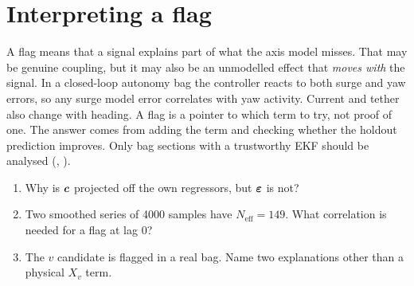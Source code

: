 \section{Interpreting a flag}

A flag means that a signal explains part of what the axis model misses. That may be genuine
coupling, but it may also be an unmodelled effect that \emph{moves with} the signal. In a
closed-loop autonomy bag the controller reacts to both surge and yaw errors, so any surge
model error correlates with yaw activity. Current and tether also change with heading. A
flag is a pointer to which term to try, not proof of one. The answer comes from adding the
term and checking whether the holdout prediction improves. Only bag sections with a
trustworthy EKF should be analysed (, ).

\begin{questions}
\begin{enumerate}
  \item Why is $\boldsymbol{c}$ projected off the own regressors, but $\boldsymbol{\varepsilon}$ is not?
  \item Two smoothed series of \num{4000} samples have $N_\mathrm{eff} = 149$. What correlation is
        needed for a flag at lag 0?
  \item The $v$ candidate is flagged in a real bag. Name two explanations other than a
        physical $X_v$ term.
\end{enumerate}
\end{questions}
